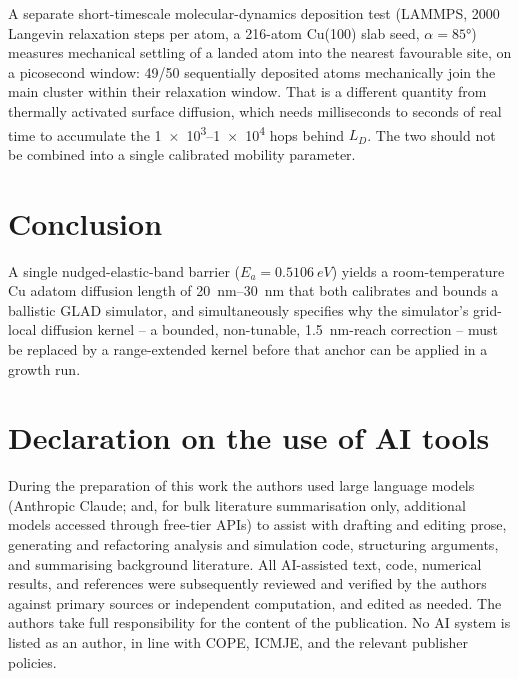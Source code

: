 \documentclass[aip,jcp,amsmath,amssymb,reprint]{revtex4-1}
\begin{document}
A separate short-timescale molecular-dynamics deposition test (LAMMPS,
\num{2000} Langevin relaxation steps per atom, a \num{216}-atom Cu(100)
slab seed, $\alpha=\ang{85}$) measures mechanical settling of a landed atom into
the nearest favourable site, on a picosecond window: \num{49}/\num{50}
sequentially deposited atoms mechanically join the main cluster within
their relaxation window. That is a different quantity from thermally
activated surface diffusion, which needs milliseconds to seconds of real
time to accumulate the \num{1e3}--\num{1e4} hops behind $L_D$. The two
should not be combined into a single calibrated mobility parameter.

\section{Conclusion}
\label{sec:conclusion}
A single nudged-elastic-band barrier ($E_a = \SI{0.5106}{eV}$) yields a
room-temperature Cu adatom diffusion length of \SIrange{20}{30}{nm} that both
calibrates and bounds a ballistic GLAD simulator, and simultaneously specifies
why the simulator's grid-local diffusion kernel -- a bounded, non-tunable,
\SI{1.5}{nm}-reach correction -- must be replaced by a range-extended kernel
before that anchor can be applied in a growth run.

\section*{Declaration on the use of AI tools}
During the preparation of this work the authors used large language models
(Anthropic Claude; and, for bulk literature summarisation only, additional
models accessed through free-tier APIs) to assist with drafting and editing
prose, generating and refactoring analysis and simulation code, structuring
arguments, and summarising background literature. All AI-assisted text, code,
numerical results, and references were subsequently reviewed and verified by the
authors against primary sources or independent computation, and edited as
needed. The authors take full responsibility for the content of the publication.
No AI system is listed as an author, in line with COPE, ICMJE, and the relevant
publisher policies.
\end{document}
